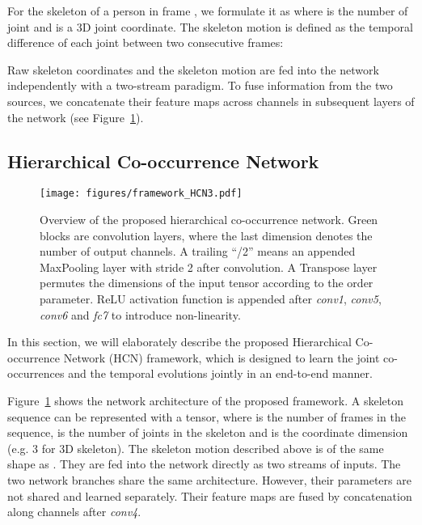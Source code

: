 \documentclass{article}
\begin{document}
For the skeleton of a person in frame , we formulate it as  where  is the number of joint and  is a 3D joint coordinate. The skeleton motion is defined as the temporal difference of each joint between two consecutive frames:



Raw skeleton coordinates  and the skeleton motion  are fed into the network independently with a two-stream paradigm. To fuse information from the two sources, we concatenate their feature maps across channels in subsequent layers of the network (see Figure~\ref{fig:framework_HCN}).

\subsection{Hierarchical Co-occurrence Network}

\begin{figure}[tbp]
  \centering
  \texttt{[image: figures/framework\_HCN3.pdf]}
  \caption{Overview of the proposed hierarchical co-occurrence network. Green blocks are convolution layers, where the last dimension denotes the number of output channels. A trailing ``/2'' means an appended MaxPooling layer with stride 2 after convolution. A Transpose layer permutes the dimensions of the input tensor according to the order parameter. ReLU activation function is appended after \emph{conv1}, \emph{conv5}, \emph{conv6} and \emph{fc7} to introduce non-linearity.}
  \label{fig:framework_HCN}
\end{figure}

In this section, we will elaborately describe the proposed Hierarchical Co-occurrence Network (HCN) framework, which is designed to learn the joint co-occurrences and the temporal evolutions jointly in an end-to-end manner.

Figure~\ref{fig:framework_HCN} shows the network architecture of the proposed framework. A skeleton sequence  can be represented with a  tensor, where  is the number of frames in the sequence,  is the number of joints in the skeleton and  is the coordinate dimension (e.g. 3 for 3D skeleton). The skeleton motion described above is of the same shape as . They are fed into the network directly as two streams of inputs. The two network branches share the same architecture. However, their parameters are not shared and learned separately. Their feature maps are fused by concatenation along channels after \emph{conv4}.
\end{document}

